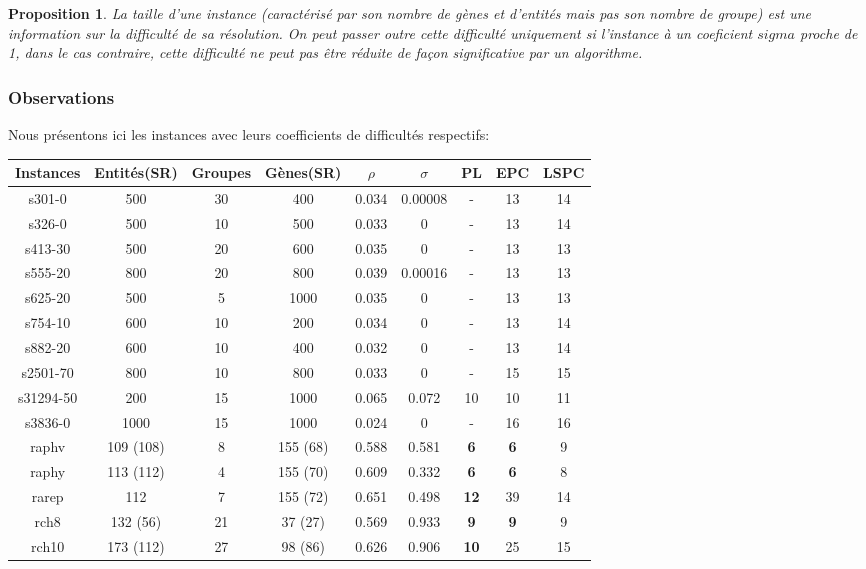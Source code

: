 \documentclass[a4paper,10pt]{article}
\newtheorem{proposition}{Proposition}
\begin{document}
\begin{proposition}
La taille d'une instance (caractérisé par son nombre de gènes et d'entités mais pas son nombre de groupe) est une information sur la difficulté de sa résolution. On peut passer outre cette difficulté uniquement si l'instance à un coeficient $sigma$ proche de 1, dans le cas contraire, cette difficulté ne peut pas être réduite de façon significative par un algorithme.
\end{proposition}


\subsubsection{Observations}

Nous présentons ici les instances avec leurs coefficients de difficultés respectifs:
\begin{center}
\begin{tabular}{|c|c|c|c|c|c|c|c|c|}
\hline 
Instances & Entités(SR) & Groupes & Gènes(SR)& $\rho$ & $\sigma$ & PL & EPC & LSPC \\ 
\hline 
s301-0 & 500 & 30 & 400 & 0.034 & 0.00008 & - & 13 & 14 \\ 
\hline 
s326-0 & 500 & 10 & 500 & 0.033 & 0 & - & 13 & 14 \\ 
\hline 
s413-30 & 500 & 20 & 600 & 0.035 & 0 & - & 13 & 13 \\ 
\hline 
s555-20 & 800 & 20 & 800 & 0.039 & 0.00016 & - & 13 & 13 \\ 
\hline 
s625-20 & 500 & 5 & 1000 & 0.035 & 0 & - & 13 & 13 \\ 
\hline 
s754-10 & 600 & 10 & 200 & 0.034 & 0 & - & 13 & 14 \\ 
\hline 
s882-20 & 600 & 10 & 400 & 0.032 & 0 & - & 13 & 14 \\ 
\hline 
s2501-70 & 800 & 10 & 800 & 0.033 & 0 & - & 15 & 15 \\ 
\hline 
s31294-50 & 200 & 15 & 1000 & 0.065 & 0.072 & 10 & 10 & 11 \\ 
\hline 
s3836-0 & 1000 & 15 & 1000 & 0.024 & 0 & - & 16 & 16 \\ 
\hline 
raphv & 109 (108) & 8 & 155 (68) & 0.588 & 0.581 & \textbf{6} & \textbf{6} & 9 \\ 
\hline 
raphy & 113 (112) & 4 & 155 (70) & 0.609 & 0.332 & \textbf{6} & \textbf{6} & 8 \\ 
\hline 
rarep & 112 & 7 & 155 (72) & 0.651 & 0.498 & \textbf{12} & 39 & 14 \\ 
\hline 
rch8 & 132 (56) & 21 & 37 (27) & 0.569 & 0.933 & \textbf{9} & \textbf{9} & 9 \\ 
\hline 
rch10 & 173 (112) & 27 & 98 (86) & 0.626 & 0.906 & \textbf{10} & 25 & 15 \\ 
\hline 
\end{tabular} 
\end{center}
\end{document}
